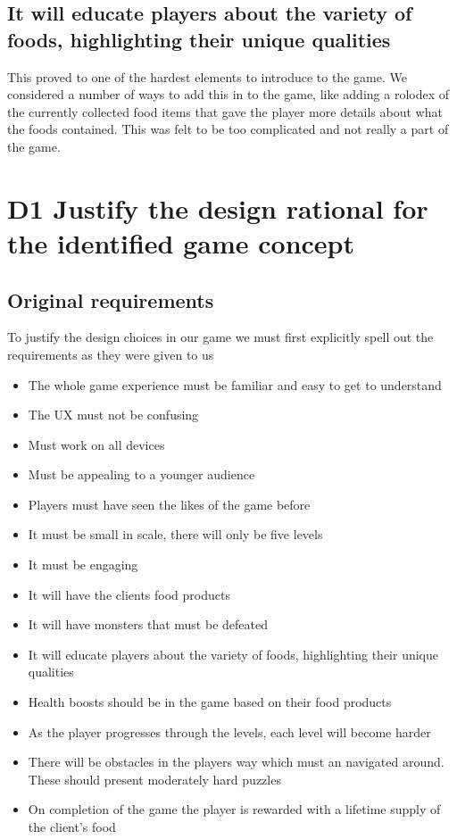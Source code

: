 \documentclass{article}
\begin{document}
\subsection{ It will educate players about the variety of foods, highlighting their unique qualities }
This proved to one of the hardest elements to introduce to the game. We considered a number of ways to add this in to the game, like adding a rolodex of the currently collected food items that gave the player more details about what the foods contained. This was felt to be too complicated and not really a part of the game.

\section{D1 Justify the design rational for the identified game concept}


\subsection{Original requirements}
To justify the design choices in our game we must first explicitly spell out the requirements as they were given to us

\begin{itemize}
\item The whole game experience must be familiar and easy to get to understand
\item The UX must not be confusing
\item Must work on all devices
\item Must be appealing to a younger audience
\item Players must have seen the likes of the game before
\item It must be small in scale, there will only be five levels
\item It must be engaging
\item It will have the clients food products
\item It will have monsters that must be defeated
\item It will educate players about the variety of foods, highlighting their unique qualities
\item Health boosts should be in the game based on their food products
\item As the player progresses through the levels, each level will become harder
\item There will be obstacles in the players way which must an navigated around. These should present moderately hard puzzles
\item On completion of the game the player is rewarded with a lifetime supply of the client's food
\end{itemize}
\end{document}
